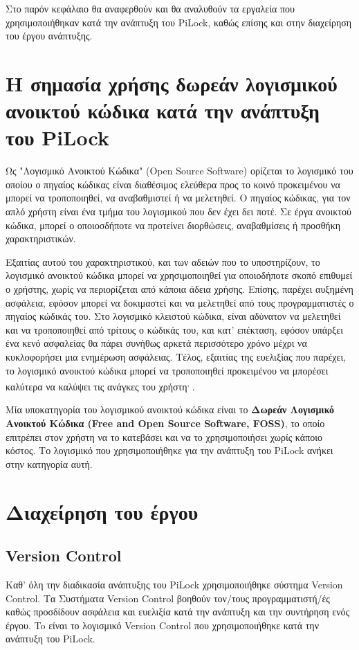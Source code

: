 Στο παρόν κεφάλαιο θα αναφερθούν και θα αναλυθούν τα εργαλεία που χρησιμοποιήθηκαν κατά την ανάπτυξη του PiLock, καθώς επίσης και στην διαχείρηση του έργου ανάπτυξης.

\section{Η σημασία χρήσης δωρεάν λογισμικού ανοικτού κώδικα κατά την ανάπτυξη του PiLock}
	\label{foss_benefits}
	Ως "Λογισμικό Ανοικτού Κώδικα" (Open Source Software) ορίζεται το λογισμικό του οποίου ο πηγαίος κώδικας είναι διαθέσιμος ελεύθερα προς το κοινό προκειμένου να μπορεί να τροποποιηθεί, να αναβαθμιστεί ή να μελετηθεί. Ο πηγαίος κώδικας, για τον απλό χρήστη είναι ένα τμήμα του λογισμικού που δεν έχει δει ποτέ. Σε έργα ανοικτού κώδικα, μπορεί ο οποιοσδήποτε να προτείνει διορθώσεις, αναβαθμίσεις ή προσθήκη χαρακτηριστικών\textsuperscript{\cite{FOSS_def}}. 

	Εξαιτίας αυτού του χαρακτηριστικού, και των αδειών που το υποστηρίζουν, το λογισμικό ανοικτού κώδικα μπορεί να χρησιμοποιηθεί για οποιοδήποτε σκοπό επιθυμεί ο χρήστης, χωρίς να περιορίζεται από κάποια άδεια χρήσης. Επίσης, παρέχει αυξημένη ασφάλεια, εφόσον μπορεί να δοκιμαστεί και να μελετηθεί από τους προγραμματιστές ο πηγαίος κώδικάς του. Στο λογισμικό κλειστού κώδικα, είναι αδύνατον να μελετηθεί και να τροποποιηθεί από τρίτους ο κώδικάς του, και κατ' επέκταση, εφόσον υπάρξει ένα κενό ασφαλείας θα πάρει συνήθως αρκετά περισσότερο χρόνο μέχρι να κυκλοφορήσει μια ενημέρωση ασφάλειας. Τέλος, εξαιτίας της ευελιξίας που παρέχει, το λογισμικό ανοικτού κώδικα μπορεί να τροποποιηθεί προκειμένου να μπορέσει καλύτερα να καλύψει τις ανάγκες του χρήστη\textsuperscript{\cite{FOSS_def}, \cite{FOSS_benefits}}.

	Μία υποκατηγορία του λογισμικού ανοικτού κώδικα είναι το \textbf{Δωρεάν Λογισμικό Ανοικτού Κώδικα (Free and Open Source Software, FOSS)}, το οποίο επιτρέπει στον χρήστη να το κατεβάσει και να το χρησιμοποιήσει χωρίς κάποιο κόστος. Το λογισμικό που χρησιμοποιήθηκε για την ανάπτυξη του PiLock ανήκει στην κατηγορία αυτή.

\section{Διαχείρηση του έργου}

	\subsection{Version Control}
		\label{subsec:vc}
		Καθ' όλη την διαδικασία ανάπτυξης του PiLock χρησιμοποιήθηκε σύστημα Version Control. Τα Συστήματα Version Control βοηθούν τον/τους προγραμματιστή/ές καθώς προσδίδουν ασφάλεια και ευελιξία κατά την ανάπτυξη και την συντήρηση ενός έργου. To  είναι το λογισμικό Version Control που χρησιμοποιήθηκε κατά την ανάπτυξη του PiLock.

